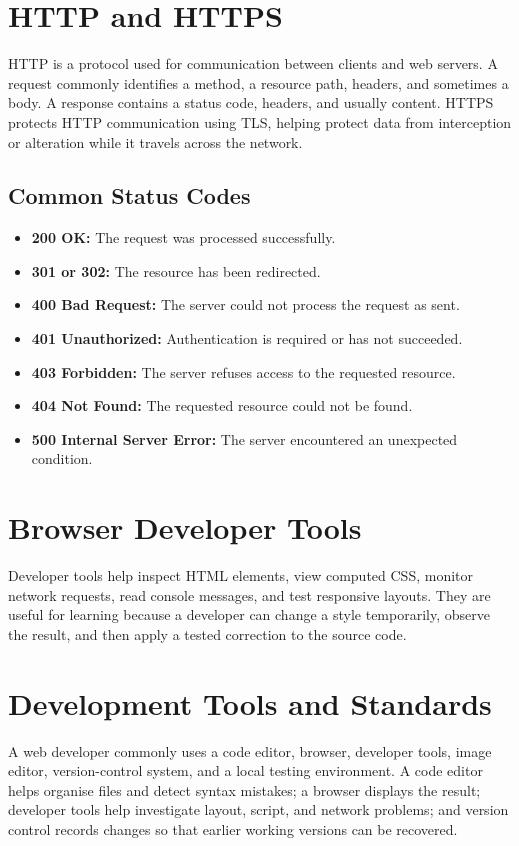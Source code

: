 \documentclass[11pt,openany,oneside]{book}
\begin{document}
\section{HTTP and HTTPS}
HTTP is a protocol used for communication between clients and web servers. A request commonly identifies a method, a resource path, headers, and sometimes a body. A response contains a status code, headers, and usually content. HTTPS protects HTTP communication using TLS, helping protect data from interception or alteration while it travels across the network.

\subsection{Common Status Codes}
\begin{itemize}
\item \textbf{200 OK:} The request was processed successfully.
\item \textbf{301 or 302:} The resource has been redirected.
\item \textbf{400 Bad Request:} The server could not process the request as sent.
\item \textbf{401 Unauthorized:} Authentication is required or has not succeeded.
\item \textbf{403 Forbidden:} The server refuses access to the requested resource.
\item \textbf{404 Not Found:} The requested resource could not be found.
\item \textbf{500 Internal Server Error:} The server encountered an unexpected condition.
\end{itemize}

\section{Browser Developer Tools}
Developer tools help inspect HTML elements, view computed CSS, monitor network requests, read console messages, and test responsive layouts. They are useful for learning because a developer can change a style temporarily, observe the result, and then apply a tested correction to the source code.


\section{Development Tools and Standards}
A web developer commonly uses a code editor, browser, developer tools, image editor, version-control system, and a local testing environment. A code editor helps organise files and detect syntax mistakes; a browser displays the result; developer tools help investigate layout, script, and network problems; and version control records changes so that earlier working versions can be recovered.
\end{document}
